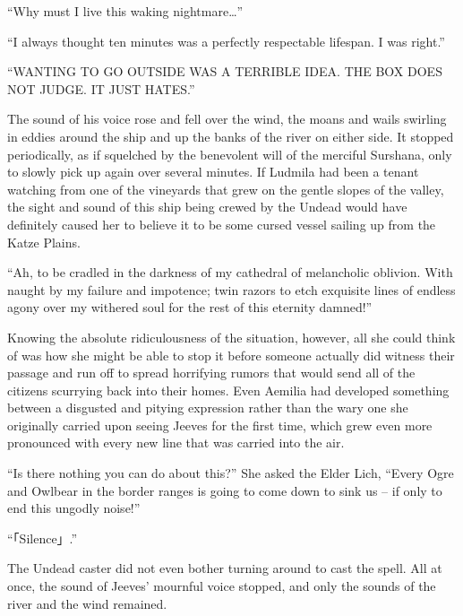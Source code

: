  

“Why must I live this waking nightmare…”

 

“I always thought ten minutes was a perfectly respectable lifespan. I was right.”

 

“WANTING TO GO OUTSIDE WAS A TERRIBLE IDEA. THE BOX DOES NOT JUDGE. IT JUST HATES.”

 

The sound of his voice rose and fell over the wind, the moans and wails swirling in eddies around the ship and up the banks of the river on either side. It stopped periodically, as if squelched by the benevolent will of the merciful Surshana, only to slowly pick up again over several minutes. If Ludmila had been a tenant watching from one of the vineyards that grew on the gentle slopes of the valley, the sight and sound of this ship being crewed by the Undead would have definitely caused her to believe it to be some cursed vessel sailing up from the Katze Plains.

 

“Ah, to be cradled in the darkness of my cathedral of melancholic oblivion. With naught by my failure and impotence; twin razors to etch exquisite lines of endless agony over my withered soul for the rest of this eternity damned!”

 

Knowing the absolute ridiculousness of the situation, however, all she could think of was how she might be able to stop it before someone actually did witness their passage and run off to spread horrifying rumors that would send all of the citizens scurrying back into their homes. Even Aemilia had developed something between a disgusted and pitying expression rather than the wary one she originally carried upon seeing Jeeves for the first time, which grew even more pronounced with every new line that was carried into the air.

 

“Is there nothing you can do about this?” She asked the Elder Lich, “Every Ogre and Owlbear in the border ranges is going to come down to sink us – if only to end this ungodly noise!”

 

“「Silence」.”

 

The Undead caster did not even bother turning around to cast the spell. All at once, the sound of Jeeves’ mournful voice stopped, and only the sounds of the river and the wind remained.

